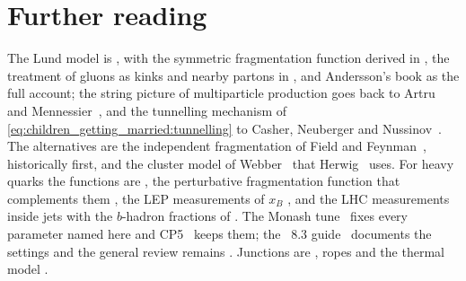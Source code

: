\section{Further reading}
\label{sec:children_getting_married:further_reading}
The Lund model is \cite{Andersson:1983ia}, with the symmetric fragmentation
function derived in \cite{Andersson:1983jt}, the treatment of gluons as
kinks and nearby partons in \cite{Sjostrand:1984ic}, and Andersson's book
\cite{Andersson:1998tv} as the full account; the string picture of
multiparticle production goes back to Artru and
Mennessier~\cite{Artru:1974hr}, and the tunnelling mechanism of
\cref{eq:children_getting_married:tunnelling} to Casher, Neuberger and
Nussinov~\cite{Casher:1978wy}. The alternatives are the independent
fragmentation of Field and Feynman~\cite{Field:1977fa}, historically first,
and the cluster model of Webber~\cite{Webber:1983if} that
Herwig~\cite{Bellm:2019zci} uses. For heavy quarks the functions are
\cite{Bowler:1981sb,Peterson:1982ak,Kartvelishvili:1977pi,Collins:1984ms},
the perturbative fragmentation function that complements them
\cite{Mele:1990cw,Braaten:1994bz,Cacciari:2005uk}, the LEP measurements of
$x_B$ \cite{ALEPH:2001pfo,OPAL:2002plk,SLD:2002poq,DELPHI:2011aa}, and the
LHC measurements inside jets \cite{ATLAS:2021agf,CMS:2021sln} with the
$b$-hadron fractions of \cite{LHCb:2019fns}. The Monash
tune~\cite{Skands:2014pea} fixes every parameter named here and
CP5~\cite{CMS:2019csb} keeps them; the \PYTHIA~8.3
guide~\cite{Bierlich:2022pfr} documents the settings and the general
review remains \cite{Buckley:2011ms}. Junctions are
\cite{Sjostrand:2002ip,Christiansen:2015yqa}, ropes
\cite{Bierlich:2014xba,Bierlich:2017vhg} and the thermal model
\cite{Fischer:2016zzs}.

